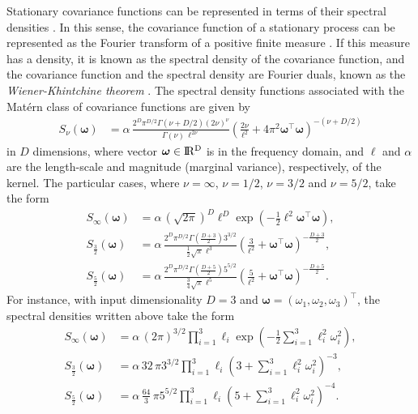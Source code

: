 Stationary covariance functions can be represented in terms of their spectral densities \citep[see, e.g.,][]{rasmussen2006gaussian}. In this sense, the covariance function of a stationary process can be represented as the Fourier transform of a positive finite measure \citep[\textit{Bochner's theorem}; see, e.g., ][]{akhiezer1993theory}. If this measure has a density, it is known as the spectral density of the covariance function, and the covariance function and the spectral density are Fourier duals, known as the \textit{Wiener-Khintchine theorem} \citep{rasmussen2006gaussian}. The spectral density functions associated with the Mat\'ern class of covariance functions are given by
%
\begin{align*}
S_{\nu}(\bm{\omega})&= \alpha \, \frac{2^D\pi^{D/2}\Gamma(\nu+D/2)(2\nu)^{\nu}}{\Gamma(\nu)\, \ell^{2\nu}}\left(\frac{2\nu}{\ell^2}+4\pi^2\bm{\omega}^\intercal \bm{\omega} \right)^{-(\nu+D/2)}
\end{align*}
%
in $D$ dimensions, where vector $\bm{\omega}\in {\rm I\!R^D}$ is in the frequency domain, and $\ell$ and $\alpha$ are the length-scale and magnitude (marginal variance), respectively, of the kernel. The particular cases, where $\nu=\infty$, $\nu=1/2$, $\nu=3/2$ and $\nu=5/2$, take the form
%
\begin{align}
S_{\infty}(\bm{\omega})&= \alpha\,(\sqrt{2\pi})^D  \ell^D \exp(-\frac{1}{2}\ell^2 \bm{\omega}^\intercal \bm{\omega}), \label{eq_specdens_inf}  \\
S_{\frac{3}{2}}(\bm{\omega})&= \alpha\,\frac{2^D\pi^{D/2}\Gamma(\frac{D+3}{2}){3}^{3/2}}{\frac{1}{2}\sqrt{\pi}\ell^3}\left(\frac{3}{\ell^2}+\bm{\omega}^\intercal \bm{\omega} \right)^{-\frac{D+3}{2}} \label{eq_specdens_32},     \\
S_{\frac{5}{2}}(\bm{\omega})&= \alpha\,\frac{2^D\pi^{D/2}\Gamma(\frac{D+5}{2}){5}^{5/2}}{\frac{3}{4}\sqrt{\pi}\ell^5}\left(\frac{5}{\ell^2}+\bm{\omega}^\intercal \bm{\omega} \right)^{-\frac{D+5}{2}}. \label{eq_specdens_52}   
\end{align}
%
For instance, with input dimensionality $D=3$ and $\bm{\omega}=(\omega_1,\omega_2,\omega_3)^\intercal$, the spectral densities written above take the form
%
\begin{align*}
S_{\infty}(\bm{\omega})&= \alpha \, (2\pi)^{3/2}  \prod_{i=1}^{3} \ell_i  \exp\!\left(-\frac{1}{2} \sum_{i=1}^{3} \ell_i^2 \omega_i^2 \right),   \\
S_{\frac{3}{2}}(\bm{\omega})&= \alpha \, 32\,\pi {3}^{3/2}\prod_{i=1}^{3}\ell_i\left(3+\sum_{i=1}^{3}\ell_i^2 \omega_i^2 \right)^{-3},   \\
S_{\frac{5}{2}}(\bm{\omega})&= \alpha \, \frac{64}{3}\,\pi {5}^{5/2}\prod_{i=1}^{3}\ell_i\left(5+\sum_{i=1}^{3}\ell_i^2 \omega_i^2 \right)^{-4}.
\end{align*}
